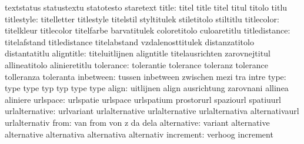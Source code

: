                            textstatus                statustextu
                           statotesto                staretext
                    title: titel                     title
                           titel                     titul
                           titolo                    titlu
               titlestyle: titelletter               titlestyle
                           titelstil                 styltitulek
                           stiletitolo               stiltitlu
               titlecolor: titelkleur                titlecolor
                           titelfarbe                barvatitulek
                           coloretitolo              culoaretitlu
            titledistance: titelafstand              titledistance
                           titelabstand              vzdalenosttitulek
                           distanzatitolo            distantatitlu
               aligntitle: titeluitlijnen            aligntitle
                           titelausrichten           zarovnejtitul
                           allineatitolo             alinieretitlu
                tolerance: tolerantie                tolerance
                           toleranz                  tolerance
                           tolleranza                toleranta
                inbetween: tussen                    inbetween
                           zwischen                  mezi
                           tra                       intre
                     type: type                      type
                           typ                       typ
                           type                      type %
                    align: uitlijnen                 align
                           ausrichtung               zarovnani
                           allinea                   aliniere
                 urlspace: urlspatie                 urlspace
                           urlspatium                prostorurl
                           spaziourl                 spatiuurl
           urlalternative: urlvariant                urlalternative
                           urlalternative            urlalternativa
                           alternativaurl            urlalternativ
                     from: van                       from
                           von                       z
                           da                        dela
              alternative: variant                   alternative
                           alternative               alternativa
                           alternativa               alternativ
                increment: verhoog                   increment
